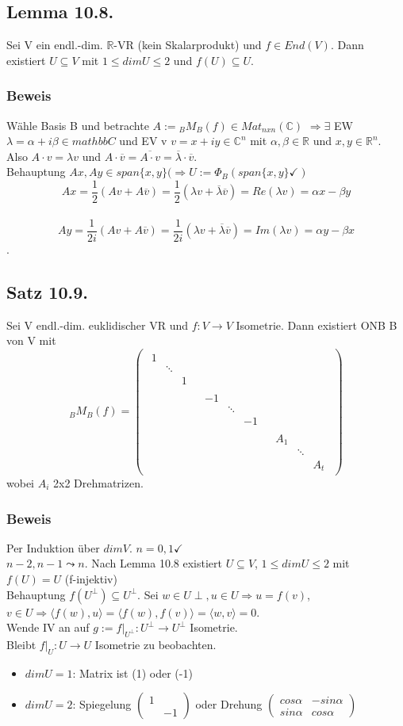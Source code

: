 \documentclass[a4paper, 12pt]{extarticle}
\newcommand{\twoXtwo}[4] {
	\left( 
	\begin{matrix}
		#1 & #2 \\
		#3 & #4
	\end{matrix} 
	\right)
}
\newcommand{\threeXthreeNoBracket}[9]{
	\begin{matrix}
		#1 & #2 & #3\\
		#4 & #5 & #6\\
		#7 & #8 & #9
	\end{matrix}
}
\newcommand{\threeXthree}[9] {
	\left( 
	\begin{matrix}
		#1 & #2 & #3\\
		#4 & #5 & #6\\
		#7 & #8 & #9
	\end{matrix}
	\right)
}
\newcommand{\skalar}[2] {
	\langle #1, #2\rangle
}
\begin{document}
\subsection*{Lemma 10.8.}
Sei V ein endl.-dim. $\mathbb R$-VR (kein Skalarprodukt) und $f\in End(V)$. Dann existiert $U\subseteq V$ mit $1\leq dim U \leq 2$ und $f(U)\subseteq U$.
\subsubsection*{Beweis}
Wähle Basis B und betrachte $A:= {}_BM_B(f) \in Mat_{nxn}(\mathbb C)$ $\Rightarrow \exists$ EW $\lambda = \alpha+i\beta \in mathbb C$ und EV v $v= x+ iy \in \mathbb C^n$ mit $\alpha, \beta \in \mathbb R$ und $x,y \in \mathbb R^n$. \\
Also $A\cdot v = \lambda v$ und $A\cdot\overline v = \overline{A\cdot v} = \overline \lambda \cdot \overline v$. \\
Behauptung $Ax,Ay\in span\{x,y\} (\Rightarrow U:= \Phi_B(span\{x,y\}\checkmark)$ \\
$$Ax = \frac{1}{2}(Av+A\overline v) = \frac{1}{2}(\lambda v + \overline\lambda \overline v) = Re(\lambda v) = \alpha x - \beta y$$ \\
$$Ay = \frac{1}{2i}(Av+A\overline v) = \frac{1}{2i}(\lambda v + \overline\lambda \overline v) = Im(\lambda v) = \alpha y - \beta x$$.
\subsection*{Satz 10.9.}
Sei V endl.-dim. euklidischer VR und $f:V\to V$ Isometrie.
Dann existiert ONB B von V mit $${}_BM_B(f)= \threeXthree{\threeXthreeNoBracket{1}{ }{ }{ }{\ddots}{ }{ }{ }{1}}{ }{ }{ }{\threeXthreeNoBracket{-1}{ }{ }{ }{\ddots}{ }{ }{ }{-1}}{ }{ }{ }{\threeXthreeNoBracket{A_1}{ }{ }{ }{\ddots}{ }{ }{ }{A_t}}$$ wobei $A_i$ 2x2 Drehmatrizen.
\subsubsection*{Beweis} 
Per Induktion über $dimV$. $n=0,1\checkmark$\\
$n-2,n-1\leadsto n$. Nach Lemma 10.8 existiert $U\subseteq V$, $1\leq dimU\leq 2$ mit $f(U) = U$ (f-injektiv) \\
Behauptung $f(U^\perp) \subseteq U^\perp$. Sei $w\in U\perp, u\in U \Rightarrow u=f(v)$, $v\in U \Rightarrow \skalar{f(w)}{u} = \skalar{f(w)}{f(v)} = \skalar{w}{v} = 0$.\\
Wende IV an auf $g:=f|_{U^\perp}:U^\perp \to U^\perp$ Isometrie. \\
Bleibt $f|_U:U\to U$ Isometrie zu beobachten.
\begin{itemize}
	\item $dimU =1$: Matrix ist (1) oder (-1)
	\item $dimU =2$: Spiegelung $\twoXtwo{1}{ }{ }{-1}$ oder Drehung $\twoXtwo{cos\alpha}{-sin\alpha}{sin\alpha}{cos\alpha}$
\end{itemize}
\end{document}
